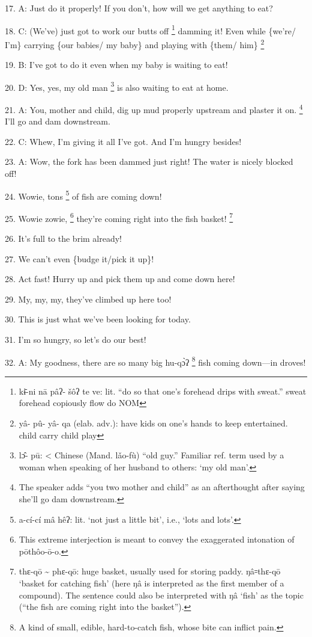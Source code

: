 17. A: Just do it properly! If you don't, how will we get anything to eat?

18. C: (We've) just got to work our butts off \footnote{kɨ̄-ni  nā  pâʔ- šôʔ  te  ve: lit. ``do so that one's forehead drips with sweat.''  sweat forehead copiously flow do NOM} damming it! Even while \{we're/
I'm\} carrying \{our babies/ my baby\} and playing with \{them/ him\} \footnote{yâ- pû- yâ- qa (elab. adv.): have kids on one's hands to keep entertained.   child carry child play}

19. B: I've got to do it even when my baby is waiting to eat!

20. D: Yes, yes, my old man \footnote{lɔ̂- pū: < Chinese (Mand. lǎo-fù) ``old guy.'' Familiar ref. term used by a woman when speaking of her husband to others: `my old man'.} is also waiting to eat at home.

21. A: You, mother and child, dig up mud properly upstream and plaster it on. \footnote{The speaker adds ``you two mother and child'' as an afterthought after saying she'll go dam downstream.}
I'll go and dam downstream.

22. C: Whew, I'm giving it all I've got.  And I'm hungry besides!

23. A: Wow, the fork has been dammed just right! The water is nicely blocked off!

24. Wowie, tons \footnote{a-cí-cí mâ hêʔ: lit. `not just a little bit', i.e., `lots and lots'.} of fish are coming down!

25. Wowie zowie, \footnote{This extreme interjection is meant to convey the exaggerated intonation of pōthôo-ō-o.} they're coming right into the fish basket! \footnote{thɛ-qō \textasciitilde{} phɛ-qō: huge basket, usually used for storing paddy. ŋâ꞊thɛ-qō `basket for catching fish' (here ŋâ is interpreted as the first member of a compound). The sentence could also be interpreted with ŋâ `fish' as the topic (``the fish are coming right into the basket'').}

26. It's full to the brim already!

27. We can't even \{budge it/pick it up\}!

28. Act fast! Hurry up and pick them up and come down here!

29. My, my, my, they've climbed up here too!

30. This is just what we've been looking for today.

31. I'm so hungry, so let's do our best!

32. A: My goodness, there are so many big hu-qɔ̀ʔ \footnote{A kind of small, edible, hard-to-catch fish, whose bite can inflict pain.} fish coming down---in
droves!

